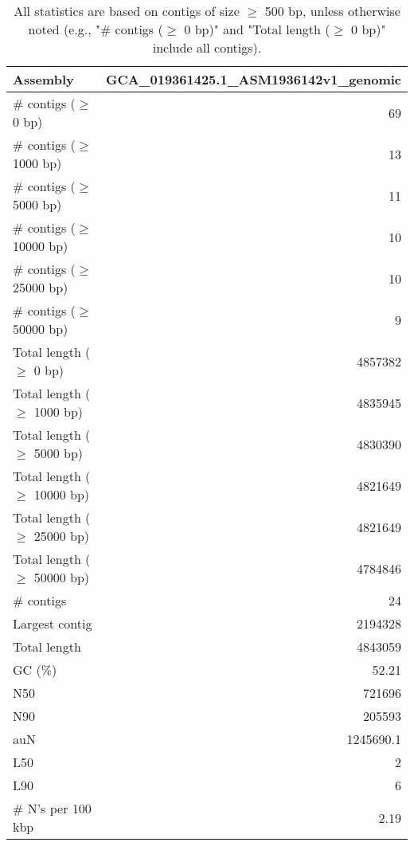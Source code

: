 \documentclass[12pt,a4paper]{article}
\begin{document}
\begin{table}[ht]
\begin{center}
\caption{All statistics are based on contigs of size $\geq$ 500 bp, unless otherwise noted (e.g., "\# contigs ($\geq$ 0 bp)" and "Total length ($\geq$ 0 bp)" include all contigs).}
\begin{tabular}{|l*{1}{|r}|}
\hline
Assembly & GCA\_019361425.1\_ASM1936142v1\_genomic \\ \hline
\# contigs ($\geq$ 0 bp) & 69 \\ \hline
\# contigs ($\geq$ 1000 bp) & 13 \\ \hline
\# contigs ($\geq$ 5000 bp) & 11 \\ \hline
\# contigs ($\geq$ 10000 bp) & 10 \\ \hline
\# contigs ($\geq$ 25000 bp) & 10 \\ \hline
\# contigs ($\geq$ 50000 bp) & 9 \\ \hline
Total length ($\geq$ 0 bp) & 4857382 \\ \hline
Total length ($\geq$ 1000 bp) & 4835945 \\ \hline
Total length ($\geq$ 5000 bp) & 4830390 \\ \hline
Total length ($\geq$ 10000 bp) & 4821649 \\ \hline
Total length ($\geq$ 25000 bp) & 4821649 \\ \hline
Total length ($\geq$ 50000 bp) & 4784846 \\ \hline
\# contigs & 24 \\ \hline
Largest contig & 2194328 \\ \hline
Total length & 4843059 \\ \hline
GC (\%) & 52.21 \\ \hline
N50 & 721696 \\ \hline
N90 & 205593 \\ \hline
auN & 1245690.1 \\ \hline
L50 & 2 \\ \hline
L90 & 6 \\ \hline
\# N's per 100 kbp & 2.19 \\ \hline
\end{tabular}
\end{center}
\end{table}
\end{document}
